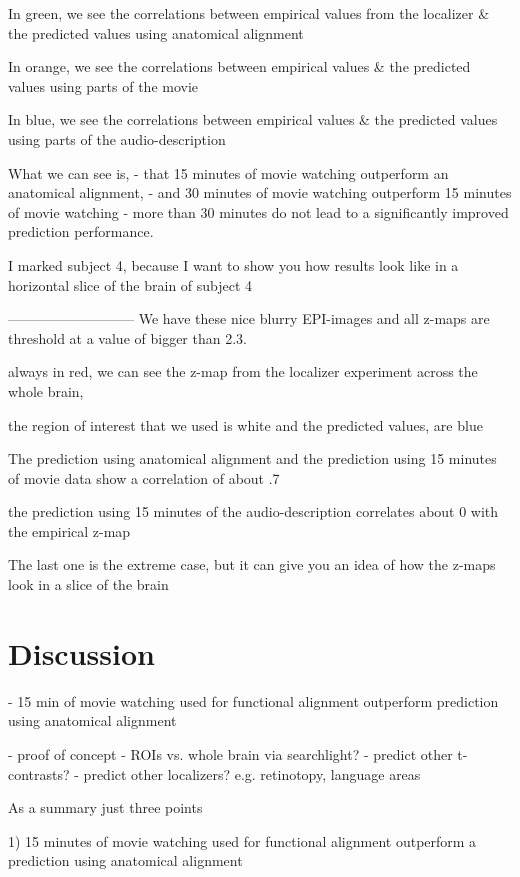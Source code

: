 In green,
we see the correlations between empirical values from the localizer
\& the predicted values using anatomical alignment

In orange,
we see the correlations between empirical values \&
the predicted values using parts of the movie

In blue,
we see the correlations between empirical values \&
the predicted values using parts of the audio-description

What we can see is,
- that 15 minutes of movie watching outperform an anatomical alignment,
- and 30 minutes of movie watching outperform 15 minutes of movie watching
- more than 30 minutes do not lead to a significantly improved prediction performance.

I marked subject 4, because I want to show you how results look like in a horizontal slice of the brain of subject 4

---------------------------
We have these nice blurry EPI-images and all z-maps are threshold
at a value of bigger than 2.3.

always in red,
we can see the z-map from the localizer experiment across the whole brain,

the region of interest that we used is white
and the predicted values, are blue

The prediction using anatomical alignment
and the prediction using 15 minutes of movie data show a correlation of about .7

the prediction using 15 minutes of the audio-description correlates about 0 with the empirical z-map

The last one is the extreme case,
but it can give you an idea of how the z-maps look in a slice of the brain



\section{Discussion}


- 15 min of movie watching
  used for functional alignment
  outperform prediction using
  anatomical alignment

- proof of concept
- ROIs vs. whole brain
  via searchlight?
- predict other t-contrasts?
- predict other localizers?
  e.g. retinotopy, language areas

As a summary just three points

1) 15 minutes of movie watching used for functional alignment outperform a prediction using anatomical alignment

